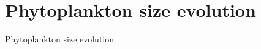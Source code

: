 \documentclass{beamer}
\begin{document}
\section{Phytoplankton size evolution}
\begin{frame}{Phytoplankton size evolution}











\end{frame}







\end{document}
